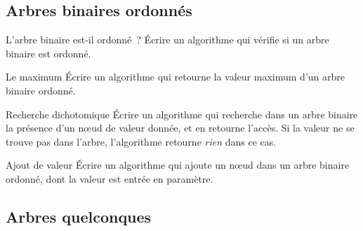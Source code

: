 	\subsection{Arbres binaires ordonnés}

		\begin{Exercice}{L'arbre binaire est-il ordonné~?}
			Écrire un algorithme qui vérifie si un arbre binaire est ordonné.
		\end{Exercice}
		
		\begin{Exercice}{Le maximum}
			Écrire un algorithme qui retourne la valeur maximum d'un arbre 
			binaire ordonné.
		\end{Exercice}
		
		\begin{Exercice}{Recherche dichotomique}
			Écrire un algorithme qui recherche dans un arbre binaire la 
			présence d'un n{\oe}ud de valeur donnée, et en retourne
			l'accès. Si la valeur ne se trouve pas dans l'arbre, 
			l'algorithme retourne \textit{rien} dans ce cas.
		\end{Exercice}
		
		\begin{Exercice}{Ajout de valeur}
			Écrire un algorithme qui ajoute un n{\oe}ud dans un arbre 
			binaire ordonné, dont la valeur est entrée en paramètre.
		\end{Exercice}
		
	\subsection{Arbres quelconques}
			

